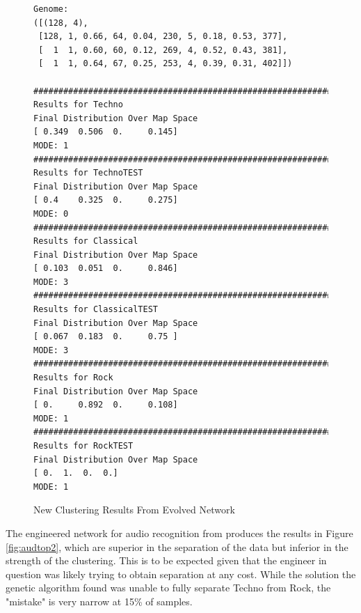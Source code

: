 \documentclass[12pt,a4paper]{article}
\begin{document}
\begin{figure}[H]
\caption{New Clustering Results From Evolved Network}
\label{fig:aud}

\begin{lstlisting}
Genome:
([(128, 4),
 [128, 1, 0.66, 64, 0.04, 230, 5, 0.18, 0.53, 377],
 [  1  1, 0.60, 60, 0.12, 269, 4, 0.52, 0.43, 381],
 [  1  1, 0.64, 67, 0.25, 253, 4, 0.39, 0.31, 402]])
  
################################################################################
Results for Techno
Final Distribution Over Map Space
[ 0.349  0.506  0.     0.145]
MODE: 1
################################################################################
Results for TechnoTEST
Final Distribution Over Map Space
[ 0.4    0.325  0.     0.275]
MODE: 0
################################################################################
Results for Classical
Final Distribution Over Map Space
[ 0.103  0.051  0.     0.846]
MODE: 3
################################################################################
Results for ClassicalTEST
Final Distribution Over Map Space
[ 0.067  0.183  0.     0.75 ]
MODE: 3
################################################################################
Results for Rock
Final Distribution Over Map Space
[ 0.     0.892  0.     0.108]
MODE: 1
################################################################################
Results for RockTEST
Final Distribution Over Map Space
[ 0.  1.  0.  0.]
MODE: 1
\end{lstlisting}
\end{figure}
The engineered network for audio recognition from \cite{MLPaper} produces the results in Figure \ref{fig:audtop2}, which are superior in the separation of the data but inferior in the strength of the clustering.  This is to be expected given that the engineer in question was likely trying to obtain separation at any cost.  While the solution the genetic algorithm found was unable to fully separate Techno from Rock, the "mistake" is very narrow at 15\% of samples.
\end{document}
